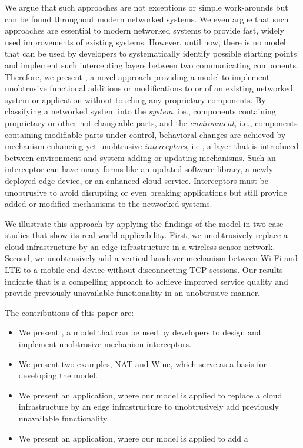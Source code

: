 We argue that such approaches are not exceptions or simple work-arounds but can be found throughout modern networked systems.
We even argue that such approaches are essential to modern networked systems to provide fast, widely used improvements of existing systems.
However, until now, there is no model that can be used by developers to systematically identify possible starting points and implement such intercepting layers between two communicating components.
Therefore, we present \emph{\mm}, a novel approach providing a model to implement unobtrusive functional additions or modifications to or of an existing networked system or application without touching any proprietary components.
By classifying a networked system into the \emph{system}, i.e., components containing proprietary or other not changeable parts, and the \emph{environment}, i.e., components containing modifiable parts under control, 
behavioral changes are achieved by mechanism-enhancing yet unobtrusive \emph{interceptors},
i.e., a layer that is introduced between environment and system adding or updating mechanisms.
Such an interceptor can have many forms like an updated software library, a newly deployed edge device, or an enhanced cloud service.
Interceptors must be unobtrusive to avoid disrupting or even breaking applications but still provide added or modified mechanisms to the networked systems.

We illustrate this approach by applying the findings of the model in two case studies
that 
show its real-world applicability.
First, we unobtrusively replace a cloud infrastructure by an edge infrastructure in a wireless sensor network.
Second, we unobtrusively add a vertical handover mechanism between Wi-Fi and LTE to a mobile end device without disconnecting TCP sessions.
Our results indicate that \mm is a compelling approach to achieve improved service quality and provide previously unavailable functionality in an unobtrusive manner.

The contributions of this paper are:
\begin{itemize}
    \item We present \mm, a model that can be used by developers to design and implement unobtrusive mechanism interceptors.
    \item We present two examples, NAT and Wine, which serve as a basis for developing the \mm model.
    \item We present an application, where our model is applied to replace a cloud infrastructure by an edge infrastructure to unobtrusively add previously unavailable functionality.
    \item We present an application, where our model is applied to add a
\end{itemize}



